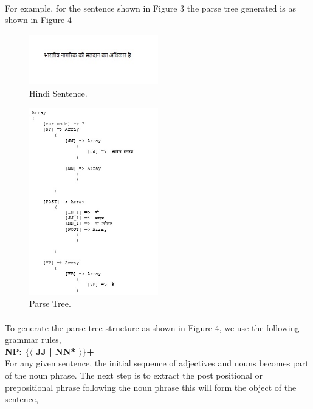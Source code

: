 \paragraph{}
For example, for the sentence shown in Figure 3 the parse tree generated is as shown in Figure 4

\begin{figure}[htb]
\centering
\includegraphics[width=0.5\textwidth]{images/sentence.jpg}
\caption{Hindi Sentence.} 
\label{fig:sentence}
\end{figure}

\begin{figure}[htb]
\centering
\includegraphics[width=0.5\textwidth]{images/parsetree.jpg}
\caption{Parse Tree.} 
\label{fig:parsetree}
\end{figure}

\break
\paragraph{}
To generate the parse tree structure as shown in Figure 4, we use the following grammar rules, \\

\textbf {NP: $\{ \langle$ JJ | NN* $\rangle \}$+}  \\

For any given sentence, the initial sequence of adjectives and nouns becomes part of the noun phrase. The next step is to extract the post positional or prepositional phrase following the noun phrase this will form the object of the sentence,

